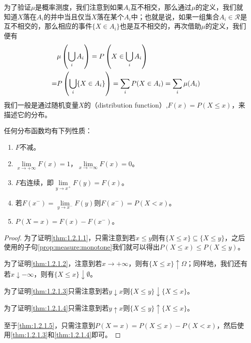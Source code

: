\documentclass[main.tex]{subfiles}
\begin{document}
为了验证\(\mu\)是概率测度，我们注意到如果\(A_i\)互不相交，那么通过\(\mu\)的定义，我们就知道\(X\)落在\(A_i\)的并中当且仅当\(X\)落在某个\(A_i\)中；也就是说，如果一组集合\(A_i \in \mathcal{R}\)是互不相交的，那么相应的事件\(\{X \in A_i\}\)也是互不相交的，再次借助\(\mu\)的定义，我们便有
\[\begin{split}
	&\mu\del{\bigcup_{i}A_i} = P\del{X \in \bigcup_{i}A_i}\\ =&P\del{\bigcup_{i} \{X \in A_i\}} = \sum_{i} P(X \in A_i) = \sum_i \mu(A_i)
\end{split}\]
我们一般是通过随机变量\(X\)的（distribution function）,\(F(x) = P(X \leq x)\)，来描述它的分布。

\begin{theorem} \label{thm:1.2.1}
	任何分布函数均有下列性质：
	\begin{enumerate}
		\item \label{thm:1.2.1.1} \(F\)不减。
		\item\label{thm:1.2.1.2} \(\lim\limits_{x \rightarrow +\infty} F(x) = 1\)，\(\lim\limits_{x \rightarrow -\infty} F(x) = 0\)。
		\item\label{thm:1.2.1.3} \(F\)右连续，即\(\lim\limits_{y \rightarrow x^+} F(y) = F(x)\)。
		\item\label{thm:1.2.1.4} 若\(F(x^-) = \lim\limits_{y\rightarrow x^-}F(y)\)则\(F(x^-) = P(X < x)\)。
		\item\label{thm:1.2.1.5} \(P(X=x) = F(x) - F(x^-)\)。
	\end{enumerate}
\end{theorem}
\begin{proof}
	为了证明\ref{thm:1.2.1.1}，只需注意到若\(x \leq y\)则有\(\{X \leq x\} \subseteq \{X \leq y\}\)，之后使用的子句\ref{prop:measure:monotone}我们就可以得出\(P(X \leq x) \leq P(X \leq y)\)。

	为了证明\ref{thm:1.2.1.2}，注意到若\(x \rightarrow +\infty\)，则有\(\{X \leq x\} \uparrow \Omega\)；同样地，我们还有若\(x \downarrow -\infty\)，则有\(\{X \leq x\} \downarrow \emptyset\)。

	为了证明\ref{thm:1.2.1.3}只需注意到若\(y\downarrow x\)则\(\{X \leq y\} \downarrow \{X \leq x\}\)。

	为了证明\ref{thm:1.2.1.4}只需注意到若\(y\uparrow x\)则\(\{X \leq y\} \uparrow \{X \leq x\}\)。

	至于\ref{thm:1.2.1.5}，只需注意到\(P(X = x) = P(X \leq x) - P(X < x)\)，然后使用\ref{thm:1.2.1.3}和\ref{thm:1.2.1.4}即可。
\end{proof}
\end{document}
